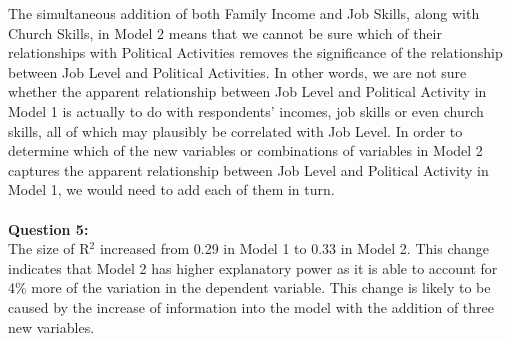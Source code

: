 \documentclass[12pt, letterpaper]{article}
\begin{document}
The simultaneous addition of both Family Income and Job Skills, along with Church Skills, in Model 2 means that we cannot be sure which of their relationships with Political Activities removes the significance of the relationship between Job Level and Political Activities. In other words, we are not sure whether the apparent relationship between Job Level and Political Activity in Model 1 is actually to do with respondents' incomes, job skills or even church skills, all of which may plausibly be correlated with Job Level. In order to determine which of the new variables or combinations of variables in Model 2 captures the apparent relationship between Job Level and Political Activity in Model 1, we would need to add each of them in turn.
\\\\
\textbf{Question 5:}\\
The size of R$^2$ increased from 0.29 in Model 1 to 0.33 in Model 2. This change indicates that Model 2 has higher explanatory power as it is able to account for 4\% more of the variation in the dependent variable. This change is likely to be caused by the increase of information into the model with the addition of three new variables.
\\\\
\end{document}
